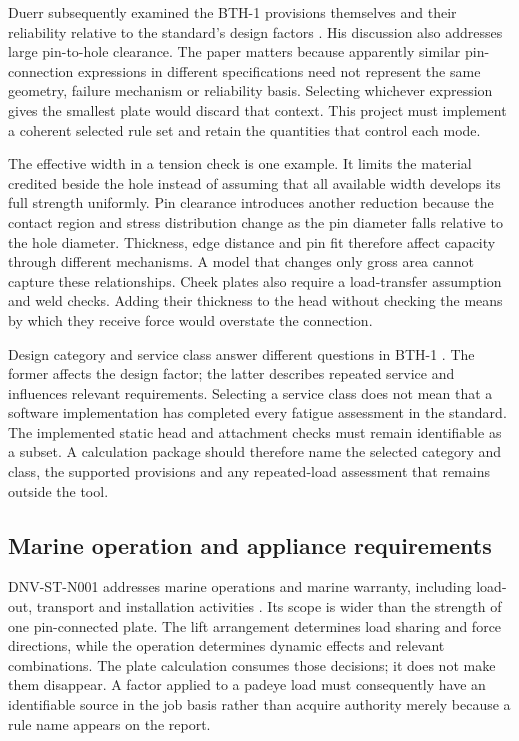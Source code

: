 Duerr subsequently examined the BTH-1 provisions themselves and their reliability relative to the standard's design factors \cite{duerr2008}. His discussion also addresses large pin-to-hole clearance. The paper matters because apparently similar pin-connection expressions in different specifications need not represent the same geometry, failure mechanism or reliability basis. Selecting whichever expression gives the smallest plate would discard that context. This project must implement a coherent selected rule set and retain the quantities that control each mode.

The effective width in a tension check is one example. It limits the material credited beside the hole instead of assuming that all available width develops its full strength uniformly. Pin clearance introduces another reduction because the contact region and stress distribution change as the pin diameter falls relative to the hole diameter. Thickness, edge distance and pin fit therefore affect capacity through different mechanisms. A model that changes only gross area cannot capture these relationships. Cheek plates also require a load-transfer assumption and weld checks. Adding their thickness to the head without checking the means by which they receive force would overstate the connection.

Design category and service class answer different questions in BTH-1 \cite{asmeBTH1}. The former affects the design factor; the latter describes repeated service and influences relevant requirements. Selecting a service class does not mean that a software implementation has completed every fatigue assessment in the standard. The implemented static head and attachment checks must remain identifiable as a subset. A calculation package should therefore name the selected category and class, the supported provisions and any repeated-load assessment that remains outside the tool.

\subsection{Marine operation and appliance requirements}
\label{sec:lit-marine-lifting}

DNV-ST-N001 addresses marine operations and marine warranty, including load-out, transport and installation activities \cite{dnvN001}. Its scope is wider than the strength of one pin-connected plate. The lift arrangement determines load sharing and force directions, while the operation determines dynamic effects and relevant combinations. The plate calculation consumes those decisions; it does not make them disappear. A factor applied to a padeye load must consequently have an identifiable source in the job basis rather than acquire authority merely because a rule name appears on the report.

